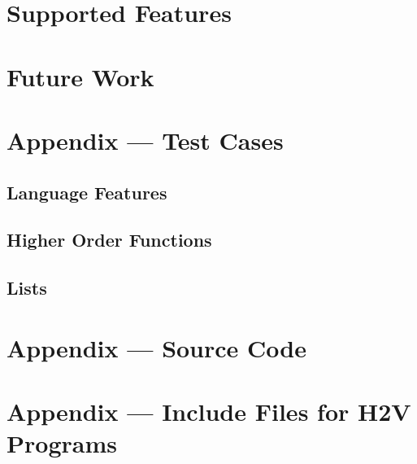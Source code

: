 \documentclass[english,onecolumn]{scrartcl}
\begin{document}
\section{Supported Features}


\section{Future Work}



\appendix
\section{Appendix --- Test Cases}
\subsection{Language Features}






\subsection{Higher Order Functions}





\subsection{Lists}




\section{Appendix --- Source Code}








\section{Appendix --- Include Files for H2V Programs}



\printbibliography
\end{document}
